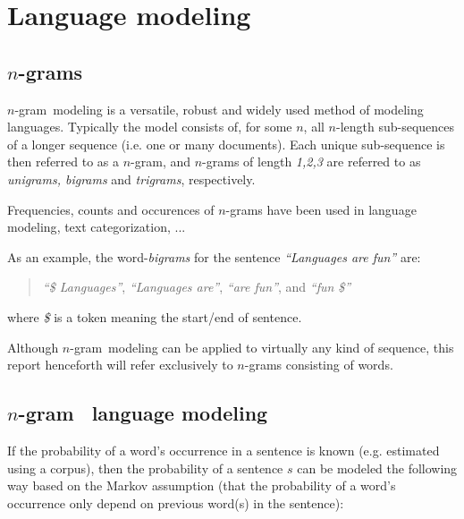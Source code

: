 \documentclass[a4paper,11pt]{kth-mag}
\newcommand{\todo}{ ... }
\newcommand{\ngram}{$n$-gram}
\begin{document}

\section{Language modeling}

\subsection{\ngram s}
\ngram~modeling is a versatile, robust and widely used method of modeling languages. Typically the model consists of, for some $n$, all $n$-length sub-sequences of a longer sequence (i.e. one or many documents). Each unique sub-sequence is then referred to as a \ngram, and \ngram s of length \emph{1,2,3} are referred to as \emph{unigrams, bigrams} and \emph{trigrams}, respectively\cite{ngrams}.

Frequencies, counts and occurences of \ngram s have been used in language modeling\cite{chen_goodman}, text categorization\cite{ngrams}, \todo

As an example, the word-\emph{bigrams} for the sentence \emph{``Languages are fun''} are:
\begin{quote}
  \vspace*{0.1cm}
  \centering
\emph{``\$ Languages''}, \emph{``Languages are''}, \emph{``are fun''}, and \emph{``fun \$''}
\end{quote}
where \emph{\$} is a token meaning the start/end of sentence.

Although \ngram~modeling can be applied to virtually any kind of sequence, this report henceforth will refer exclusively to \ngram s consisting of words.

\subsection{\ngram~ language modeling}
If the probability of a word's occurrence in a sentence is known (e.g. estimated using a corpus), then the probability of a sentence $s$ can be modeled the following way based on the Markov assumption (that the probability of a word's occurrence only depend on previous word(s) in the sentence):
\end{document}

